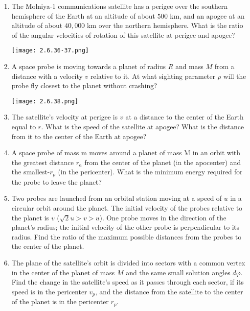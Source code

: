 \documentclass{article}
\begin{document}
\begin{enumerate}[label=2.6.\arabic*]
\item The Molniya-1 communications satellite has a perigee over the southern hemisphere of the Earth at an altitude of about $500$ km, and an apogee at an altitude of about $40,000$ km over the northern hemisphere. What is the ratio of the angular velocities of rotation of this satellite at perigee and apogee?

\begin{center}
    \texttt{[image: 2.6.36-37.png]}
\end{center}

\item A space probe is moving towards a planet of radius $R$ and mass $M$ from a distance with a velocity $v$ relative to it. At what sighting parameter $\rho$ will the probe fly closest to the planet without crashing?

\begin{center}
    \texttt{[image: 2.6.38.png]}
\end{center}

\item The satellite's velocity at perigee is $v$ at a distance to the center of the Earth equal to $r$. What is the speed of the satellite at apogee? What is the distance from it to the center of the Earth at apogee?

\item A space probe of mass m moves around a planet of mass M in an orbit with the greatest distance $r_a$ from the center of the planet (in the apocenter) and the smallest-$r_p$ (in the pericenter). What is the minimum energy required for the probe to leave the planet?

\item Two probes are launched from an orbital station moving at a speed of $u$ in a circular orbit around the planet. The initial velocity of the probes relative to the planet is $v$ ($\sqrt{2} u > v > u$). One probe moves in the direction of the planet's radius; the initial velocity of the other probe is perpendicular to its radius. Find the ratio of the maximum possible distances from the probes to the center of the planet.

\item The plane of the satellite's orbit is divided into sectors with a common vertex in the center of the planet of mass $M$ and the same small solution angles $d \varphi$. Find the change in the satellite's speed as it passes through each sector, if its speed is in the pericenter $v_p$, and the distance from the satellite to the center of the planet is in the pericenter $r_p$.


\end{enumerate}
\end{document}
